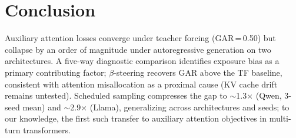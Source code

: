 \section{Conclusion}\label{sec:conclusion}

 Auxiliary attention losses converge under teacher forcing (GAR\,=\,0.50) but collapse by an order of magnitude under autoregressive generation on two architectures. A five-way diagnostic comparison identifies exposure bias as a primary contributing factor; $\beta$-steering recovers GAR above the TF baseline, consistent with attention misallocation as a proximal cause (KV cache drift remains untested). Scheduled sampling compresses the gap to ${\sim}$1.3$\times$ (Qwen, 3-seed mean) and ${\sim}$2.9$\times$ (Llama), generalizing across architectures and seeds; to our knowledge, the first such transfer to auxiliary attention objectives in multi-turn transformers.
